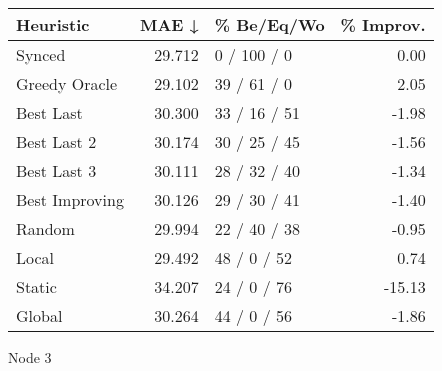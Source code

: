 \begin{tabular}{lrlr}
\toprule
\textbf{Heuristic} & \textbf{MAE ↓} & \textbf{\% Be/Eq/Wo} & \textbf{\% Improv.} \\
\midrule
            Synced &         29.712 &          0 / 100 / 0 &                0.00 \\
     Greedy Oracle &         29.102 &          39 / 61 / 0 &                2.05 \\
         Best Last &         30.300 &         33 / 16 / 51 &               -1.98 \\
       Best Last 2 &         30.174 &         30 / 25 / 45 &               -1.56 \\
       Best Last 3 &         30.111 &         28 / 32 / 40 &               -1.34 \\
    Best Improving &         30.126 &         29 / 30 / 41 &               -1.40 \\
            Random &         29.994 &         22 / 40 / 38 &               -0.95 \\
             Local &         29.492 &          48 / 0 / 52 &                0.74 \\
            Static &         34.207 &          24 / 0 / 76 &              -15.13 \\
            Global &         30.264 &          44 / 0 / 56 &               -1.86 \\
\bottomrule
\end{tabular}
\caption{Node 3}
\label{tab:non_lr05_le1_bs2_3}
